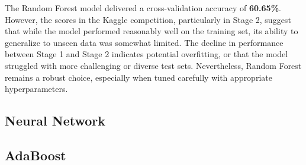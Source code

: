 \documentclass[12pt,a4paper]{article}
\begin{document}
The Random Forest model delivered a cross-validation accuracy of \textbf{60.65\%}. However, the scores in the Kaggle competition, particularly in Stage 2, suggest that while the model performed reasonably well on the training set, its ability to generalize to unseen data was somewhat limited. The decline in performance between Stage 1 and Stage 2 indicates potential overfitting, or that the model struggled with more challenging or diverse test sets. Nevertheless, Random Forest remains a robust choice, especially when tuned carefully with appropriate hyperparameters.




\subsection{Neural Network}

\subsection{AdaBoost}
\end{document}
